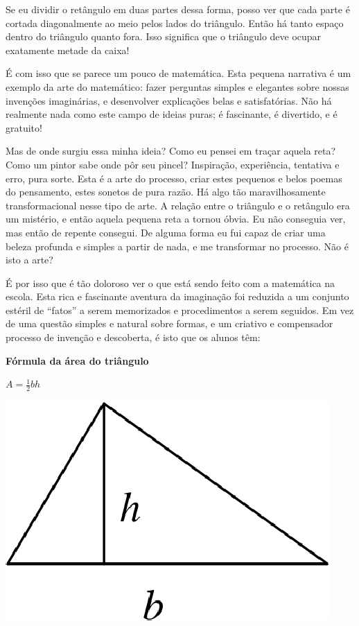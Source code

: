 \documentclass[a4paper,oneside,12pt,notitlepage]{article}
\begin{document}
Se eu dividir o retângulo em duas partes dessa forma, posso ver que cada parte é cortada diagonalmente ao meio pelos lados do triângulo.
Então há tanto espaço dentro do triângulo quanto fora.
Isso significa que o triângulo deve ocupar exatamente metade da caixa!

É com isso que se parece um pouco de matemática. %
Esta pequena narrativa é um exemplo da arte do matemático: fazer perguntas simples e elegantes sobre nossas invenções imaginárias, e desenvolver explicações belas e satisfatórias.
Não há realmente nada como este campo de ideias puras; é fascinante, é divertido, e é gratuito! %

Mas de onde surgiu essa minha ideia?
Como eu pensei em traçar aquela reta?
Como um pintor sabe onde pôr seu pincel?
Inspiração, experiência, tentativa e erro, pura sorte.
Esta é a arte do processo, criar estes pequenos e belos poemas do pensamento, estes sonetos de pura razão. %
Há algo tão maravilhosamente transformacional nesse tipo de arte.
A relação entre o triângulo e o retângulo era um mistério, e então aquela pequena reta a tornou óbvia.
Eu não conseguia ver, mas então de repente consegui.
De alguma forma eu fui capaz de criar uma beleza profunda e simples a partir de nada, e me transformar no processo.
Não é isto a arte? %

É por isso que é tão doloroso ver o que está sendo feito com a matemática na escola.
Esta rica e fascinante aventura da imaginação foi reduzida a um conjunto estéril de ``fatos'' a serem memorizados e procedimentos a serem seguidos.
Em vez de uma questão simples e natural sobre formas, e um criativo e compensador processo de invenção e descoberta, é isto que os alunos têm:

\vspace{1em}

\begin{minipage}[c]{0.45\linewidth}
	\centering
	\textbf{Fórmula da área do triângulo}

	$A=\frac12 b h$
\end{minipage}
\hspace{0.5em}
\begin{minipage}[c]{0.45\linewidth}
	\centering
	\includegraphics{triangle2.eps}
\end{minipage}
\end{document}

